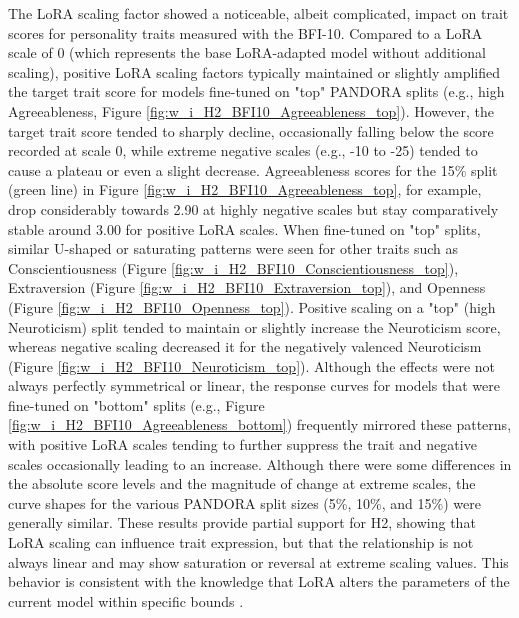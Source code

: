 \documentclass{DESSThesis}
\begin{document}
The LoRA scaling factor showed a noticeable, albeit complicated, impact on trait scores for personality traits measured with the BFI-10. Compared to a LoRA scale of 0 (which represents the base LoRA-adapted model without additional scaling), positive LoRA scaling factors typically maintained or slightly amplified the target trait score for models fine-tuned on "top" PANDORA splits (e.g., high Agreeableness, Figure \ref{fig:w_i_H2_BFI10_Agreeableness_top}). However, the target trait score tended to sharply decline, occasionally falling below the score recorded at scale 0, while extreme negative scales (e.g., -10 to -25) tended to cause a plateau or even a slight decrease. Agreeableness scores for the 15\% split (green line) in Figure \ref{fig:w_i_H2_BFI10_Agreeableness_top}, for example, drop considerably towards 2.90 at highly negative scales but stay comparatively stable around 3.00 for positive LoRA scales. When fine-tuned on "top" splits, similar U-shaped or saturating patterns were seen for other traits such as Conscientiousness (Figure \ref{fig:w_i_H2_BFI10_Conscientiousness_top}), Extraversion (Figure \ref{fig:w_i_H2_BFI10_Extraversion_top}), and Openness (Figure \ref{fig:w_i_H2_BFI10_Openness_top}). Positive scaling on a "top" (high Neuroticism) split tended to maintain or slightly increase the Neuroticism score, whereas negative scaling decreased it for the negatively valenced Neuroticism (Figure \ref{fig:w_i_H2_BFI10_Neuroticism_top}). Although the effects were not always perfectly symmetrical or linear, the response curves for models that were fine-tuned on "bottom" splits (e.g., Figure \ref{fig:w_i_H2_BFI10_Agreeableness_bottom}) frequently mirrored these patterns, with positive LoRA scales tending to further suppress the trait and negative scales occasionally leading to an increase. Although there were some differences in the absolute score levels and the magnitude of change at extreme scales, the curve shapes for the various PANDORA split sizes (5\%, 10\%, and 15\%) were generally similar. These results provide partial support for H2, showing that LoRA scaling can influence trait expression, but that the relationship is not always linear and may show saturation or reversal at extreme scaling values. This behavior is consistent with the knowledge that LoRA alters the parameters of the current model within specific bounds \cite{hu_lora_2021, lialin_scaling_2023}.
\end{document}
